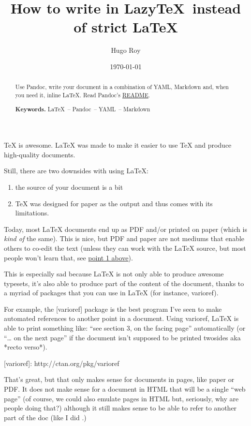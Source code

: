 \documentclass[english,]{amsart}
\title{How to write in Lazy\TeX~instead of strict \LaTeX}
\author{Hugo Roy}
\date{\today}
\providecommand{\tightlist}{%
  \setlength{\itemsep}{0pt}\setlength{\parskip}{0pt}}
\newenvironment{toggleable}{\begin{minipage}\small}{\end{minipage}}
\begin{document}
\maketitle
\begin{abstract}
Use Pandoc, write your document in a combination of YAML, Markdown and,
when you need it, inline LaTeX. Read Pandoc's
\href{http://pandoc.org/README.html}{README}.
\bigskip

\noindent \textbf{Keywords.}
LaTeX~-- Pandoc~-- YAML~-- Markdown
\end{abstract}




TeX is awesome. LaTeX was made to make it easier to use TeX and produce
high-quality documents.

Still, there are two downsides with using LaTeX:

\begin{enumerate}
\def\labelenumi{\arabic{enumi}.}
\tightlist
\item
  the source of your document is a bit
\item
  TeX was designed for paper as the output and thus comes with its
  limitations.
\end{enumerate}

Today, most LaTeX documents end up as PDF and/or printed on paper (which
is \emph{kind of} the same). This is nice, but PDF and paper are not
mediums that enable others to co-edit the text (unless they can work
with the LaTeX source, but most people won't learn that,
see\label{above} \hyperref[point1]{point 1 above}).

This is especially sad because LaTeX is not only able to produce awesome
typesets, it's also able to produce part of the content of the document,
thanks to a myriad of packages that you can use in LaTeX (for instance,
varioref).

\begin{toggleable}
For example, the [varioref] package is the best program I've seen to
make automated references to another point in a document. Using
varioref, LaTeX is able to print something like: “see section 3, on
the facing page” automatically (or “… on the next page” if the
document isn't supposed to be printed twosides aka *recto verso*).

[varioref]: http://ctan.org/pkg/varioref

That's great, but that only makes sense for documents in pages, like
paper or PDF. It does not make sense for a document in HTML that will
be a single “web page” (of course, we could also emulate pages in HTML
but, seriously, why are people doing that?) although it still makes
sense to be able to refer to another part of the doc (like I did
.)
\end{toggleable}
\end{document}
